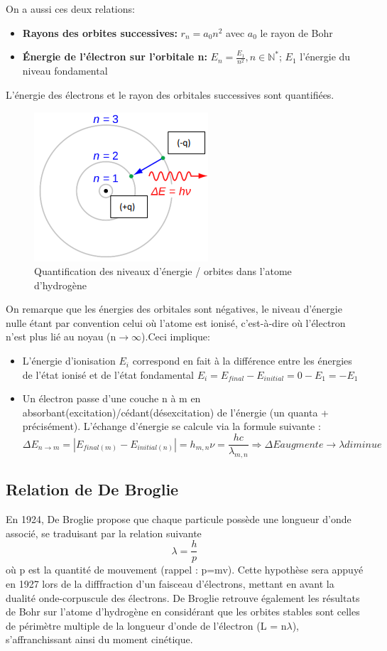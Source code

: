 \documentclass{article}
\begin{document}
On a aussi ces deux relations:
\begin{itemize}
    \item \textbf{Rayons des orbites successives:} $r_{n} = a_{0}n^{2}$ avec $a_{0}$ le rayon de Bohr
    \item \textbf{Énergie de l'électron sur l'orbitale n:} $E_{n} = \frac{E_{1}}{n^{2}}, n\in\mathbb{N^{*}}$; $E_{1}$ l'énergie du niveau fondamental 
\end{itemize}
L'énergie des électrons et le rayon des orbitales successives sont quantifiées.
\begin{figure}[h]
    \centering
    \includegraphics[scale=0.5]{figure_2.png}
    \caption{Quantification des niveaux d'énergie / orbites dans l'atome d'hydrogène}
\end{figure}

On remarque que les énergies des orbitales sont négatives, le niveau d'énergie nulle étant par convention celui où l'atome est ionisé, c'est-à-dire où l'électron n'est plus lié au noyau (n$\rightarrow\infty$).\newpage Ceci implique:
\begin{itemize}
    \item L'énergie d'ionisation $E_{i}$ correspond en fait à la différence entre les énergies de l'état ionisé et de l'état fondamental $E_{i} = E_{final} - E_{initial} = 0 - E_{1} = -E_{1}$
    \item Un électron passe d'une couche n à m en absorbant(excitation)/cédant(désexcitation) de l'énergie (un quanta + précisément). L'échange d'énergie se calcule via la formule suivante :
    \[ \Delta E_{n\to m} = |E_{final(m)}-E_{initial(n)}| = h_{m,n}\nu = \frac{hc}{\lambda_{m,n}}  \Longrightarrow \Delta E augmente \rightarrow \lambda diminue \]
\end{itemize}

\subsection{Relation de De Broglie}
En 1924, De Broglie propose que chaque particule possède une longueur d'onde associé, se traduisant par la relation suivante \[ \lambda = \frac{h}{p} \] où p est la quantité de mouvement (rappel : p=mv). Cette hypothèse sera appuyé en 1927 lors de la difffraction d'un faisceau d'électrons, mettant en avant la dualité onde-corpuscule des électrons. De Broglie retrouve également les résultats de Bohr sur l'atome d'hydrogène en considérant que les orbites stables sont celles de périmètre multiple de la longueur d'onde de l'électron (L = n$\lambda$), s'affranchissant ainsi du moment cinétique.
\end{document}
